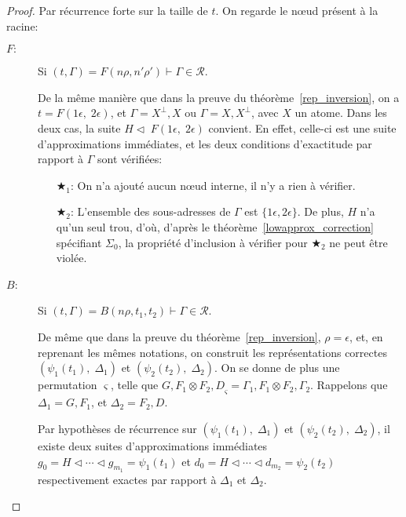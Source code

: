 \documentclass[11pt,a4paper]{article}
\theoremstyle{plain}
\theoremstyle{definition}
\theoremstyle{remark}
\newcommand*{\orth}{^\perp}
\newcommand*{\tensor}{\otimes}
\newcommand*{\someperm}{\varsigma}
\newcommand*{\sequent}{\Gamma}
\newcommand*{\sequentbis}{\Delta}
\newcommand*{\representations}{\ensuremath{\mathcal{R}}}
\newcommand*{\relapprox}{\ensuremath{\triangleleft}}
\newcommand*{\lowapprox}{\ensuremath{\Sigma_0}}
\newcommand*{\exactcond}{\bigstar_1}
\newcommand*{\exactcondbis}{\bigstar_2}
\begin{document}
\begin{proof}
    Par récurrence forte sur la taille de $t$. On regarde le n\oe ud présent à la racine:
    \begin{description}
        \item[$F:$] 
            Si $(t, \sequent) = F(n\rho, n'\rho') \vdash \sequent \in \representations$.
        
            De la même manière que dans la preuve du théorème~\ref{rep_inversion}, on a $t = F(1 \epsilon, \; 2 \epsilon)$, et $\sequent = X\orth, X$ ou $\sequent = X, X\orth$, avec $X$ un atome. Dans les deux cas, la suite $H \relapprox \; F(1 \epsilon, \; 2 \epsilon)$ convient. En effet, celle-ci est une suite d'approximations immédiates, et les deux conditions d'exactitude par rapport à $\sequent$ sont vérifiées:
    
            \begin{enumerate}
                \item[$\exactcond$:] On n'a ajouté aucun n\oe ud interne, il n'y a rien à vérifier.
    
                \item[$\exactcondbis$:] L'ensemble des sous-adresses de $\sequent$ est $\{ 1 \epsilon, 2 \epsilon \}$. De plus, $H$ n'a qu'un seul trou, d'où, d'après le théorème~\ref{lowapprox_correction} spécifiant $\lowapprox$, la propriété d'inclusion à vérifier pour $\exactcondbis$ ne peut être violée.
            \end{enumerate}

        \item[$B$:] 
            Si $(t, \sequent) = B(n\rho, t_1, t_2) \vdash \sequent \in \representations$.

            De même que dans la preuve du théorème~\ref{rep_inversion}, $\rho = \epsilon$, et, en reprenant les mêmes notations, on construit les représentations correctes $\left( \psi_1 \left( t_1 \right), \; \sequentbis_1 \right)$ et $\left( \psi_2 \left( t_2 \right), \; \sequentbis_2 \right)$. On se donne de plus une permutation $\someperm$, telle que ${G, F_1 \tensor F_2, D}_\someperm = \sequent_1, F_1 \tensor F_2, \sequent_2$. Rappelons que $\sequentbis_1 = G, F_1$, et $\sequentbis_2 = F_2, D$.
    
            Par hypothèses de récurrence sur $\left( \psi_1 \left( t_1 \right), \; \sequentbis_1 \right)$ et $\left( \psi_2 \left( t_2 \right), \; \sequentbis_2 \right)$, il existe deux suites d'approximations immédiates $g_0 = H \relapprox \cdots \relapprox g_{m_1} = \psi_1 \left( t_1 \right)$ et $d_0 = H \relapprox \cdots \relapprox d_{m_2} = \psi_2 \left( t_2 \right)$ respectivement exactes par rapport à $\sequentbis_1$ et $\sequentbis_2$.
    

\end{description}
\end{proof}
\end{document}
